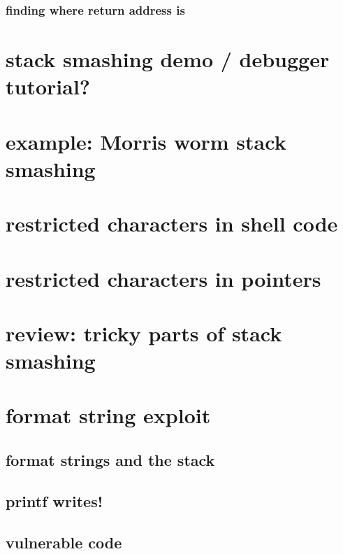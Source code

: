 \subsubsection{finding where return address is}


\section{stack smashing demo / debugger tutorial?}


\section{example: Morris worm stack smashing}



\section{restricted characters in shell code}
   

\section{restricted characters in pointers}


\section{review: tricky parts of stack smashing}


\section{format string exploit}

\subsection{format strings and the stack}


\subsection{printf writes!}


\subsection{vulnerable code}


